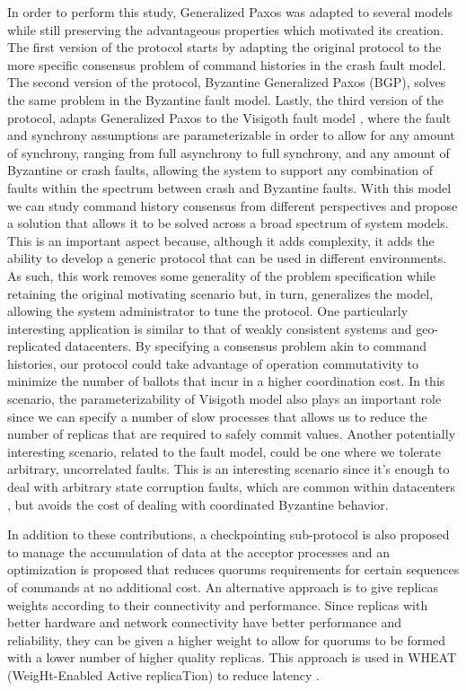In order to perform this study, Generalized Paxos was adapted to several models while still preserving the advantageous properties which motivated its creation. The first version of the protocol starts by adapting the original protocol to the more specific consensus problem of command histories in the crash fault model. The second version of the protocol, Byzantine Generalized Paxos (BGP), solves the same problem in the Byzantine fault model. Lastly, the third version of the protocol, adapts Generalized Paxos to the Visigoth fault model \cite{Porto2015}, where the fault and synchrony assumptions are parameterizable in order to allow for any amount of synchrony, ranging from full asynchrony to full synchrony, and any amount of Byzantine or crash faults, allowing the system to support any combination of faults within the spectrum between crash and Byzantine faults. With this model we can study command history consensus from different perspectives and propose a solution that allows it to be solved across a broad spectrum of system models. This is an important aspect because, although it adds complexity, it adds the ability to develop a generic protocol that can be used in different environments. As such, this work removes some generality of the problem specification while retaining the original motivating scenario but, in turn, generalizes the model, allowing the system administrator to tune the protocol.  One particularly interesting application is similar to that of weakly consistent systems and geo-replicated datacenters. By specifying a consensus problem akin to command histories, our protocol could take advantage of operation commutativity to minimize the number of ballots that incur in a higher coordination cost. In this scenario, the parameterizability of Visigoth model also plays an important role since we can specify a number of slow processes that allows us to reduce the number of replicas that are required to safely commit values. Another potentially interesting scenario, related to the fault model, could be one where we tolerate arbitrary, uncorrelated faults. This is an interesting scenario since it's enough to deal with arbitrary state corruption faults, which are common within datacenters \cite{AmazonS32}, but avoids the cost of dealing with coordinated Byzantine behavior.\par 
In addition to these contributions, a checkpointing sub-protocol is also proposed to manage the accumulation of data at the acceptor processes and an optimization is proposed that reduces quorums requirements for certain sequences of commands at no additional cost.
{\color{red}An alternative approach is to give replicas weights according to their connectivity and performance. Since replicas with better hardware and network connectivity have better performance and reliability, they can be given a higher weight to allow for quorums to be formed with a lower number of higher quality replicas. This approach is used in WHEAT (WeigHt-Enabled Active replicaTion) to reduce latency \cite{Sousa2016}}.  


